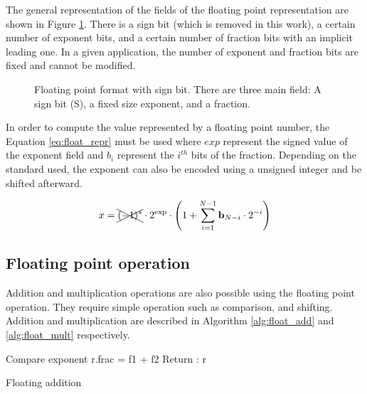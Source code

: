 The general representation of the fields of the floating point representation are shown in Figure \ref{fig:float_repr}. There is a sign bit (which is removed in this work), a certain number of exponent bits, and a certain number of fraction bits with an implicit leading one. In a given application, the number of exponent and fraction bits are fixed and cannot be modified.

\begin{figure}[!ht]
\begin{mdframed}
	\centering
	
	\caption{Floating point format with sign bit. There are three main field: A sign bit (S), a fixed size exponent, and a fraction.}
	\label{fig:float_repr}
\end{mdframed}
\end{figure}

In order to compute the value represented by a floating point number, the Equation \ref{eq:float_repr} must be used where $exp$ represent the signed value of the exponent field and $b_i$ represent the $i^{th}$ bits of the fraction. Depending on the standard used, the exponent can also be encoded using a unsigned integer and be shifted afterward.

\begin{equation}
x = \xcancel{(-1)^s} \cdot 2^{\text{exp}} \cdot \left( 1 + \sum_{i=1}^{N-1} \text{\textbf{b}}_{N-i} \cdot 2^{-i}\right)
\label{eq:float_repr}
\end{equation}

\subsection{Floating point operation}
Addition and multiplication operations are also possible using the floating point operation. They require simple operation such as comparison, and shifting. Addition and multiplication are described in Algorithm \ref{alg:float_add} and \ref{alg:float_mult} respectively.

\begin{algorithm}[H]
\SetAlgoLined
{}
Compare exponent\;
r.frac = f1 + f2\;
Return : r\;
\caption{Floating addition}
\label{alg:float_add}
\end{algorithm}

